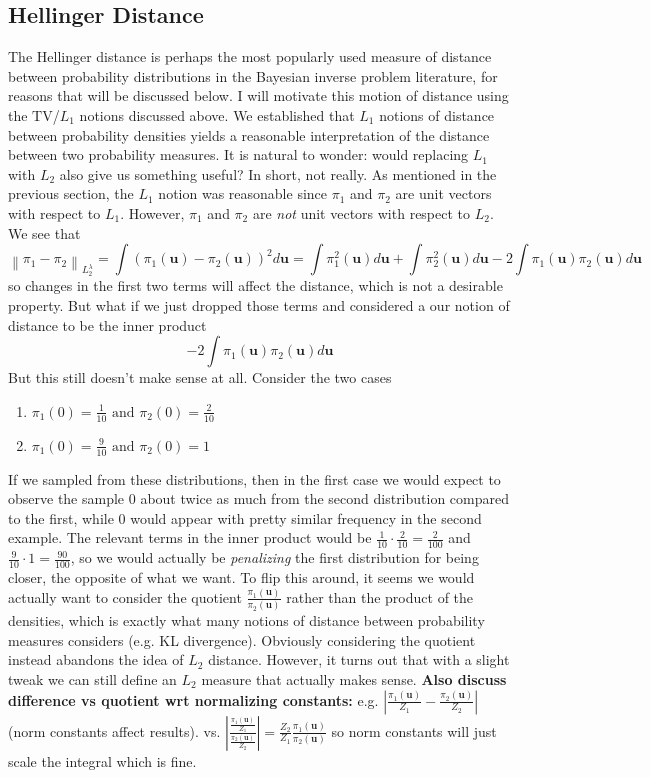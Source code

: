 \documentclass[12pt]{article}
\newcommand{\bpar}{\mathbf{u}} %
\newcommand*{\norm}[1]{\left\lVert#1\right\rVert}
\newcommand*{\abs}[1]{\left\lvert#1\right\rvert}
\begin{document}
\subsection{Hellinger Distance}
The Hellinger distance is perhaps the most popularly used measure of distance between probability distributions in the Bayesian inverse problem literature, for reasons that will be discussed below. I will motivate this motion of distance using the $\text{TV}$/$L_1$ notions discussed above. We established that $L_1$ notions of distance between probability densities yields a reasonable interpretation of the distance between two probability measures. It is natural to wonder: would replacing $L_1$ with $L_2$ also give us something useful? In short, not really. As mentioned in the previous section, the $L_1$ notion was reasonable since $\pi_1$ and $\pi_2$ are unit vectors with respect to $L_1$. However, $\pi_1$ and $\pi_2$ are \textit{not} unit vectors with respect to $L_2$. We see that 
\[\norm{\pi_1 - \pi_2}_{L_2^\lambda} = \int (\pi_1(\bpar) - \pi_2(\bpar))^2 d\bpar = \int \pi_1^2(\bpar) d\bpar + \int \pi_2^2(\bpar) d\bpar - 2\int \pi_1(\bpar)\pi_2(\bpar) d\bpar\]
so changes in the first two terms will affect the distance, which is not a desirable property. But what if we just dropped those terms and considered a our notion of distance to be the inner product 
\[- 2\int \pi_1(\bpar)\pi_2(\bpar) d\bpar\]
But this still doesn't make sense at all. Consider the two cases
\begin{enumerate}
\item $\pi_1(0) = \frac{1}{10} \text{ and } \pi_2(0) = \frac{2}{10}$
\item $\pi_1(0) = \frac{9}{10} \text{ and } \pi_2(0) = 1$
\end{enumerate}
If we sampled from these distributions, then in the first case we would expect to observe the sample $0$ about twice as much from the second distribution compared to the first, while $0$ would appear with pretty similar frequency in the second example. The relevant terms in the inner product would be $\frac{1}{10} \cdot \frac{2}{10} = \frac{2}{100}$ and $\frac{9}{10} \cdot 1 = \frac{90}{100}$, so we would actually be \textit{penalizing} the first distribution for being closer, the opposite of what we want. To flip this around, it seems we would actually want to consider the quotient $\frac{\pi_1(\bpar)}{\pi_2(\bpar)}$ rather than the product of the densities, which is exactly what many notions of distance between probability measures considers (e.g. KL divergence). Obviously considering the quotient instead abandons the idea of $L_2$ distance. However, it turns out that with a slight tweak we can still define an $L_2$ measure that actually makes sense. 
\textbf{Also discuss difference vs quotient wrt normalizing constants:} e.g. $\abs{\frac{\pi_1(\bpar)}{Z_1} - \frac{\pi_2(\bpar)}{Z_2}}$ (norm constants affect results). vs. 
$\abs{\frac{\frac{\pi_1(\bpar)}{Z_1}}{\frac{\pi_2(\bpar)}{Z_2}}} = \frac{Z_2}{Z_1} \frac{\pi_1(\bpar)}{\pi_2(\bpar)}$ so norm constants will just scale the integral which is fine. 
\end{document}
